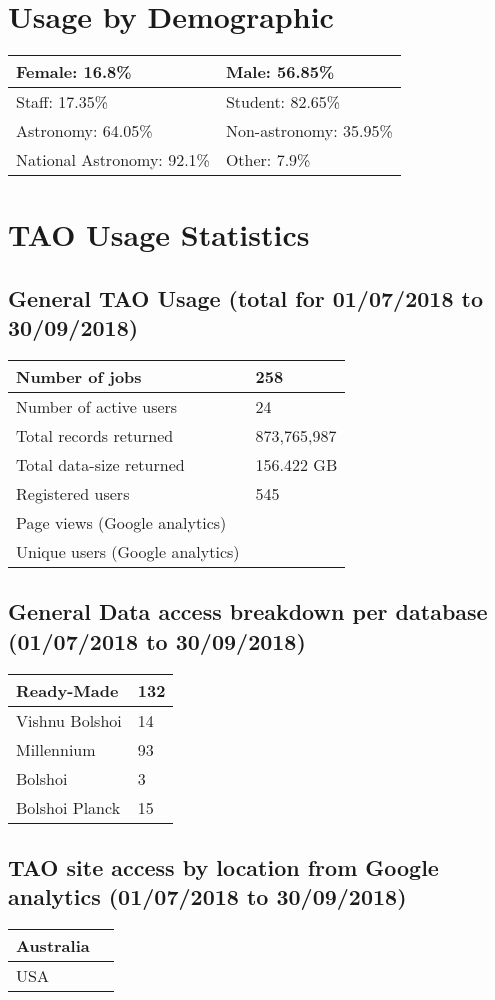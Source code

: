 \documentclass{article}%
\begin{document}
\section{Usage by Demographic}%

%
\begin{longtabu}{X[l] X[l]}%
Female:  16.8\%&Male:  56.85\%\\%
\hline%
Staff:  17.35\%&Student:  82.65\%\\%
\hline%
Astronomy:  64.05\%&Non{-}astronomy:  35.95\%\\%
\hline%
National Astronomy:  92.1\%&Other:  7.9\%\\%
\hline%
\end{longtabu}%
\newpage%
\section{TAO Usage Statistics}%

%
\subsection{General TAO Usage (total for 01/07/2018 to 30/09/2018)}%

%
\begin{longtabu}{X[l] X[l]}%
Number of jobs&258\\%
\hline%
Number of active users&24\\%
\hline%
Total records returned&873,765,987\\%
\hline%
Total data{-}size returned&156.422 GB\\%
\hline%
Registered users&545\\%
\hline%
Page views (Google analytics)&\\%
\hline%
Unique users (Google analytics)&\\%
\hline%
\end{longtabu}%
\subsection{General Data access breakdown per database (01/07/2018 to 30/09/2018)}%

%
\begin{longtabu}{X[l] X[l]}%
Ready{-}Made&132\\%
\hline%
Vishnu Bolshoi&14\\%
\hline%
Millennium&93\\%
\hline%
Bolshoi&3\\%
\hline%
Bolshoi Planck&15\\%
\hline%
\end{longtabu}%
\subsection{TAO site access by location from Google analytics (01/07/2018 to 30/09/2018)}%

%
\begin{longtabu}{X[l] X[l]}%
Australia&\\%
\hline%
USA&\\%
\hline%
\end{longtabu}%
\end{document}
